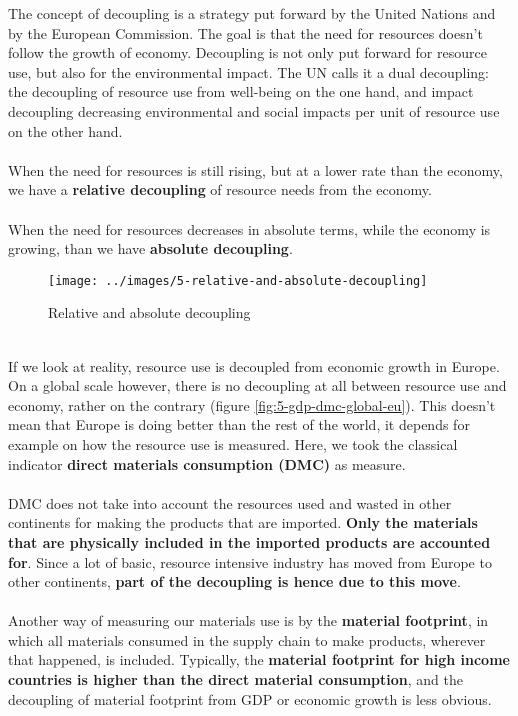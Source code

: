 \documentclass[../summary.tex]{subfiles}
\begin{document}
	The concept of decoupling is a strategy put forward by the United Nations and by the European Commission. The goal is that the need for resources doesn’t follow the growth of economy. Decoupling is not only put forward for resource use, but also for the environmental impact. The UN calls it a dual decoupling: the decoupling of resource use from well-being on the one hand, and impact decoupling decreasing environmental and social impacts per unit of resource use on the other hand.
	\\\\
	When the need for resources is still rising, but at a lower rate than the economy, we have a \textbf{relative decoupling} of resource needs from the economy.
	\\\\
	When the need for resources decreases in absolute terms, while the economy is growing, than we have \textbf{absolute decoupling}.
	
	\begin{figure}[H]
		\centering
		\texttt{[image: ../images/5-relative-and-absolute-decoupling]}
		\caption{Relative and absolute decoupling}
		\label{fig:5-relative-and-absolute-decoupling}
	\end{figure}
	
	\ \\
	If we look at reality, resource use is decoupled from economic growth in Europe. On a global scale however, there is no decoupling at all between resource use and economy, rather on the contrary (figure \ref{fig:5-gdp-dmc-global-eu}). This doesn't mean that Europe is doing better than the rest of the world, it depends for example on how the resource use is measured. Here, we took the classical indicator \textbf{direct materials consumption (DMC)} as measure.
	\\
	\\
	DMC does not take into account the resources used and wasted in other continents for making the products that are imported. \textbf{Only the materials that are physically included in the imported products are accounted for}. Since a lot of basic, resource intensive industry has moved from Europe to other continents, \textbf{part of the decoupling is hence due to this move}. 
	\\
	\\
	Another way of measuring our materials use is by the \textbf{material footprint}, in which all materials consumed in the supply chain to make products, wherever that happened, is included. Typically, the \textbf{material footprint for high income countries is higher than the direct material consumption}, and the decoupling of material footprint from GDP or economic growth is less obvious.
	
\end{document}

